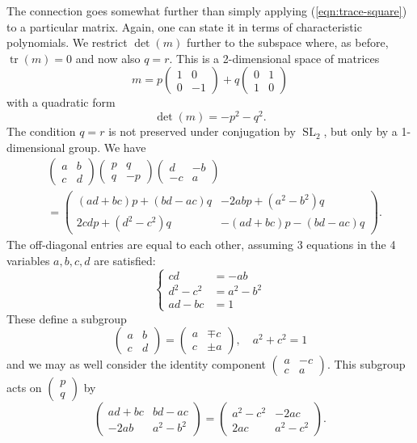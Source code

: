 \documentclass[11pt]{amsart}
\theoremstyle{definition}
\numberwithin{figure}{section}
\numberwithin{equation}{section}
\numberwithin{table}{section}
\newcommand{\SL}{\operatorname{SL}}
\newcommand{\tr}{\operatorname{tr}}
\begin{document}
The connection goes somewhat further than simply applying (\ref{eqn:trace-square}) to a particular matrix.
Again, one can state it in terms of characteristic polynomials.
We restrict $\det(m)$ further to the subspace where, as before, $\tr(m)=0$ and now also $q=r$.
This is a 2-dimensional space of matrices
\[
m = p \begin{pmatrix} 1 & 0 \\ 0 & -1 \end{pmatrix} + q \begin{pmatrix} 0 & 1 \\ 1 & 0 \end{pmatrix}
\]
with a quadratic form
\[
\det(m) = -p^2 - q^2.
\]
The condition $q=r$ is not preserved under conjugation by $\SL_2$, but only by a 1-dimensional group.
We have
\begin{align*}
&\begin{pmatrix} a & b \\ c & d \end{pmatrix} \begin{pmatrix} p & q \\ q & -p \end{pmatrix} \begin{pmatrix} d & -b \\ -c & a \end{pmatrix} \\
&=\begin{pmatrix} (ad+bc)p+(bd-ac)q & -2abp + (a^2-b^2)q \\ 2cdp + (d^2-c^2)q & -(ad+bc)p-(bd-ac)q \end{pmatrix}
.
\end{align*}
The off-diagonal entries are equal to each other, assuming 3 equations in the 4 variables $a,b,c,d$ are satisfied:
\[
\left\{
\begin{aligned}
cd &=-ab \\
d^2-c^2 &= a^2-b^2 \\
ad-bc &=1
\end{aligned}
\right.
\]
These define a subgroup
\[
\begin{pmatrix} a & b \\ c & d \end{pmatrix} = \begin{pmatrix} a & \mp c \\ c & \pm a \end{pmatrix},
\quad a^2+c^2 = 1
\]
and we may as well consider the identity component $\begin{pmatrix} a & -c \\ c & a \end{pmatrix}$.
This subgroup acts on $\begin{pmatrix} p \\ q \end{pmatrix}$ by
\[
\begin{pmatrix} ad+bc & bd-ac \\ -2ab & a^2-b^2 \end{pmatrix} = \begin{pmatrix} a^2-c^2 & -2ac \\ 2ac & a^2-c^2 \end{pmatrix}.
\]
\end{document}
